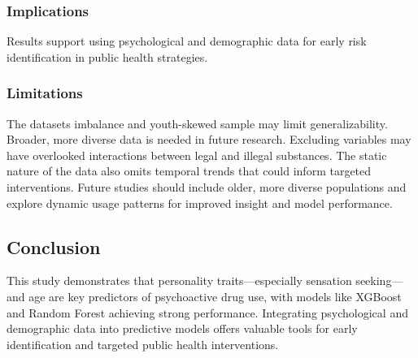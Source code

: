 \documentclass{article}
\begin{document}
\subsubsection*{Implications}
Results support using psychological and demographic data for early risk identification in public health strategies.

\subsubsection*{Limitations}
The datasets imbalance and youth-skewed sample may limit generalizability. Broader, more diverse data is needed in future research. Excluding variables may have overlooked interactions between legal and illegal substances. The static nature of the data also omits temporal trends that could inform targeted interventions. Future studies should include older, more diverse populations and explore dynamic usage patterns for improved insight and model performance.

\subsection*{Conclusion}

This study demonstrates that personality traits—especially sensation seeking—and age are key predictors of psychoactive drug use, with models like XGBoost and Random Forest achieving strong performance. Integrating psychological and demographic data into predictive models offers valuable tools for early identification and targeted public health interventions.
\end{document}
